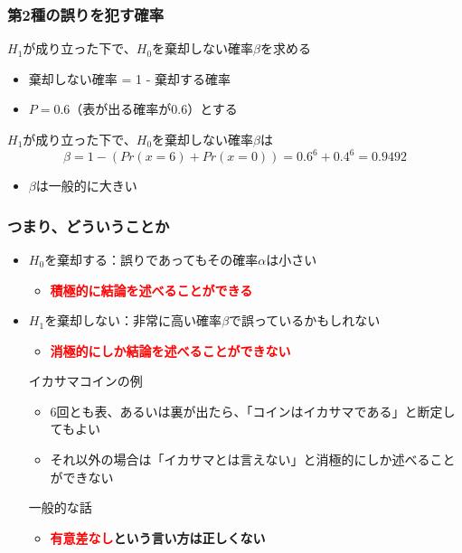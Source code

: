 \documentclass[aspectratio=169]{beamer}
\begin{document}
    \begin{frame}
        \frametitle{第2種の誤りを犯す確率}
            $H_1$が成り立った下で、$H_0$を棄却しない確率$\beta$を求める
            \begin{itemize}
                \item 棄却しない確率 = 1 - 棄却する確率
                \item $P = 0.6$（表が出る確率が0.6）とする
            \end{itemize}

            $H_1$が成り立った下で、$H_0$を棄却しない確率$\beta$は
            \begin{equation}
                \beta = 1 - (Pr(x=6)+Pr(x=0)) = 0.6^6 + 0.4^6 = 0.9492
            \end{equation}

            \begin{itemize}
                \item $\beta$は一般的に大きい
            \end{itemize}
    \end{frame}
    \begin{frame}
        \frametitle{つまり、どういうことか}
        \begin{itemize}
            \item $H_0$を棄却する：誤りであってもその確率$\alpha$は小さい 
            \begin{itemize}
                \item \textbf{\textcolor{red}{積極的に結論を述べることができる}}
            \end{itemize}
            \item $H_1$を棄却しない：非常に高い確率$\beta$で誤っているかもしれない
            \begin{itemize}
                \item \textbf{\textcolor{red}{消極的にしか結論を述べることができない}}
            \end{itemize}
            \begin{block}{イカサマコインの例}
                \begin{itemize}
                    \item 6回とも表、あるいは裏が出たら、「コインはイカサマである」と断定してもよい
                    \item それ以外の場合は「イカサマとは言えない」と消極的にしか述べることができない
                \end{itemize}
            \end{block}
            \begin{block}{一般的な話}
                \begin{itemize}
                    \item \textbf{\textcolor{red}{有意差なし}という言い方は正しくない}
                \end{itemize}
            \end{block}
        \end{itemize}

    \end{frame}
\end{document}
